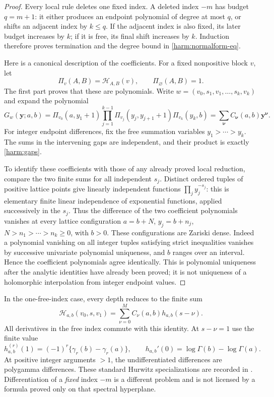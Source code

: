 \documentclass[11pt,a4paper]{article}
\numberwithin{equation}{section}
\theoremstyle{definition}
\theoremstyle{remark}
\begin{document}
\begin{proof}
Every local rule deletes one fixed index. A deleted index $-m$ has
budget $q=m+1$: it either produces an endpoint polynomial of degree
at most $q$, or shifts an adjacent index by $k\le q$. If the adjacent
index is also fixed, its later budget increases by $k$; if it is free,
its final shift increases by $k$. Induction therefore proves termination
and the degree bound in \eqref{harm:normalform-eq}.

Here is a canonical description of the coefficients. For a fixed
nonpositive block $v$, let
\[
 \Pi_v(A,B)=\mathcal H_{A,B}(v),\qquad \Pi_{\varnothing}(A,B)=1.
\]
The first part proves that these are polynomials. Write
$w=(v_0,s_1,v_1,\ldots,s_k,v_k)$ and expand the polynomial
\begin{equation}
 G_w(\boldsymbol y;a,b)=
   \Pi_{v_0}(a,y_1+1)
   \prod_{j=1}^{k-1}\Pi_{v_j}(y_j,y_{j+1}+1)
   \Pi_{v_k}(y_k,b)
   =\sum_{\boldsymbol\nu}C_{\boldsymbol\nu}(a,b)
                                 \boldsymbol y^{\boldsymbol\nu}.
 \label{harm:gaps}
\end{equation}
For integer endpoint differences, fix the free summation variables
$y_1>\cdots>y_k$. The sums in the intervening gaps are independent,
and their product is exactly \eqref{harm:gaps}.

To identify these coefficients with those of any already proved local
reduction, compare the two finite sums for all independent $s_j$.
Distinct ordered tuples of positive lattice points give linearly
independent functions $\prod_j y_j^{-s_j}$: this is elementary finite
linear independence of exponential functions, applied successively
in the $s_j$. Thus the difference of the two coefficient polynomials
vanishes at every lattice configuration
$a=b+N$, $y_j=b+n_j$, $N>n_1>\cdots>n_k\ge0$, with $b>0$.
These configurations are Zariski dense. Indeed a polynomial vanishing
on all integer tuples satisfying strict inequalities vanishes by
successive univariate polynomial uniqueness, and $b$ ranges over an
interval. Hence the coefficient polynomials agree identically.
This is polynomial uniqueness after the analytic identities have
already been proved; it is not uniqueness of a holomorphic interpolation
from integer endpoint values.
\end{proof}

In the one-free-index case, every depth reduces to the finite sum
\begin{equation}
           \mathcal H_{a,b}(v_0,s,v_1)
              =\sum_{\nu=0}^M C_\nu(a,b)h_{a,b}(s-\nu).
 \label{harm:onefree}
\end{equation}
All derivatives in the free index commute with this identity. At
$s-\nu=1$ use the finite value
\begin{equation}
 h_{a,b}^{(r)}(1)=(-1)^r\{\gamma_r(b)-\gamma_r(a)\},
 \qquad
 h_{a,b}'(0)=\log\Gamma(b)-\log\Gamma(a).
 \label{harm:jets}
\end{equation}
At positive integer arguments $>1$, the undifferentiated differences
are polygamma differences. These standard Hurwitz specializations are
recorded in \cite{DLMF}. Differentiation of a \emph{fixed}
index $-m$ is a different problem and is not licensed by a formula
proved only on that spectral hyperplane.
\end{document}
